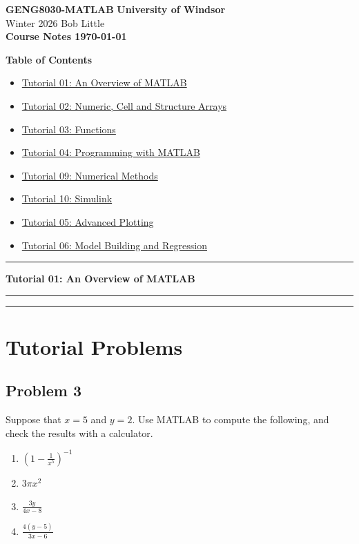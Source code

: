 \documentclass[DIN, pagenumber=false, fontsize=11pt, parskip=half]{scrartcl}
\newcommand{\mytitle}[1]{{\noindent\Huge\textbf{#1}}}
\newcommand{\mypart}[1]{\vspace{1cm}\hrule\vspace{0.5cm}\noindent\textbf{\LARGE #1}\vspace{0.5cm}\hrule\vspace{1cm}}
\newcommand{\myproblem}[1]{\subsection*{#1}}
\begin{document}
\noindent\textbf{GENG8030-MATLAB} \hfill \textbf{University of Windsor}\\
Winter 2026 \hfill Bob Little\\

\mytitle{\Large Course Notes \hfill \today}

\vspace{1cm}
\noindent\textbf{\large Table of Contents}
\vspace{0.5cm}

\begin{itemize}
    \item \hyperref[tut1]{Tutorial 01: An Overview of MATLAB}
    \item \hyperref[tut2]{Tutorial 02: Numeric, Cell and Structure Arrays}
    \item \hyperref[tut3]{Tutorial 03: Functions}
    \item \hyperref[tut4]{Tutorial 04: Programming with MATLAB}
    \item \hyperref[tut9]{Tutorial 09: Numerical Methods}
    \item \hyperref[tut10]{Tutorial 10: Simulink}
    \item \hyperref[tut5]{Tutorial 05: Advanced Plotting}
    \item \hyperref[tut6]{Tutorial 06: Model Building and Regression}
\end{itemize}

\vspace{0.5cm}

\label{tut1}
\mypart{Tutorial 01: An Overview of MATLAB}



\vspace{1cm}
\hrule
\vspace{0.5cm}

\section*{Tutorial Problems}

\myproblem{Problem 3}
Suppose that $x=5$ and $y=2$. Use MATLAB to compute the following, and check the results with a calculator.
\begin{enumerate}
    \item[a.] $(1-\frac{1}{x^{5}})^{-1}$
    \item[b.] $3\pi x^{2}$
    \item[c.] $\frac{3y}{4x-8}$
    \item[d.] $\frac{4(y-5)}{3x-6}$
\end{enumerate}
\end{document}
